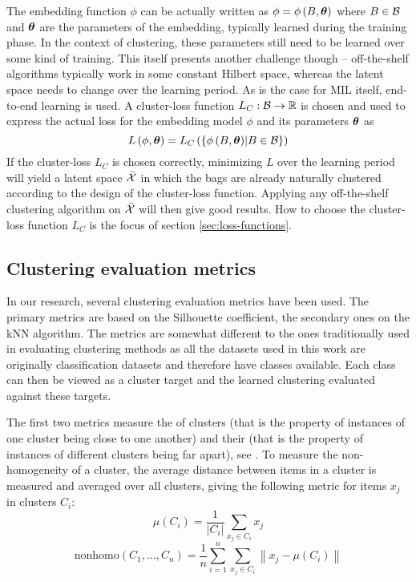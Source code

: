 The embedding function \( \phi \) can be actually written as \( \phi = \phi \left( B, \bm{\theta} \right) \) where \( B \in \mathcal{B} \) and \( \bm{\theta} \) are the parameters of the embedding, typically learned during the training phase. In the context of clustering, these parameters still need to be learned over some kind of training. This itself presents another challenge though -- off-the-shelf algorithms typically work in some constant Hilbert space, whereas the latent space needs to change over the learning period. As is the case for MIL itself, end-to-end learning is used. A cluster-loss function \( L_C: \mathcal{B} \to \mathbb{R} \) is chosen and used to express the actual loss for the embedding model \( \phi \) and its parameters \( \bm{\theta} \) as
\[ L \left( \phi, \bm{\theta} \right) = L_C \left( \left\{ \phi \left( B, \bm{\theta} \right) \middle| B \in \mathcal{B} \right\} \right) \]
If the cluster-loss \( L_C \) is chosen correctly, minimizing \( L \) over the learning period will yield a latent space \( \bar{\mathcal{X}} \) in which the bags are already naturally clustered according to the design of the cluster-loss function. Applying any off-the-shelf clustering algorithm on \( \bar{\mathcal{X}} \) will then give good results. How to choose the cluster-loss function \( L_C \) is the focus of section \ref{sec:loss-functions}.

\subsection{Clustering evaluation metrics}\label{sec:clustering-metrics}
In our research, several clustering evaluation metrics have been used. The primary metrics are based on the Silhouette coefficient, the secondary ones on the kNN algorithm. The metrics are somewhat different to the ones traditionally used in evaluating clustering methods as all the datasets used in this work are originally classification datasets and therefore have classes available. Each class can then be viewed as a cluster target and the learned clustering evaluated against these targets.

The first two metrics measure the  of clusters (that is the property of instances of one cluster being close to one another) and their  (that is the property of instances of different clusters being far apart), see \cite{everitt_cluster_2001}. To measure the non-homogeneity of a cluster, the average distance between items in a cluster is measured and averaged over all clusters, giving the following metric for items \( x_j \) in clusters \( C_i \):
\[ \mu \left( C_i \right) = \frac{1}{\left\lvert C_i \right\rvert} \sum_{x_j \in C_i} x_j \]
\[ \mathrm{nonhomo} \left( C_1, \dots, C_n \right) = \frac{1}{n} \sum_{i = 1}^n \sum_{x_j \in C_i} \left\lVert x_j - \mu \left( C_i \right) \right\rVert \]

